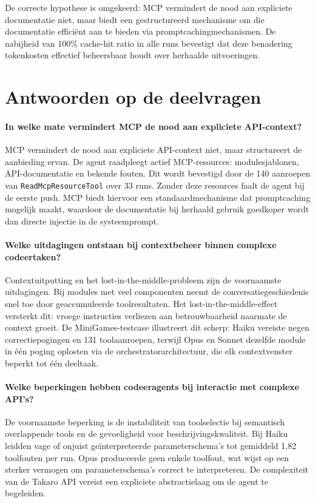 De correcte hypothese is omgekeerd: MCP vermindert de nood aan expliciete documentatie niet, maar biedt een gestructureerd mechanisme om die documentatie efficiënt aan te bieden via promptcachingmechanismen. De nabijheid van 100\% cache-hit ratio in alle runs bevestigt dat deze benadering tokenkosten effectief beheersbaar houdt over herhaalde uitvoeringen.

\section{Antwoorden op de deelvragen}

\paragraph{In welke mate vermindert MCP de nood aan expliciete API-context?}
MCP vermindert de nood aan expliciete API-context niet, maar structureert de aanbieding ervan. De agent raadpleegt actief MCP-resources: modulesjablonen, API-documentatie en bekende fouten. Dit wordt bevestigd door de 140 aanroepen van \texttt{ReadMcpResourceTool} over 33 runs. Zonder deze resources faalt de agent bij de eerste push. MCP biedt hiervoor een standaardmechanisme dat promptcaching mogelijk maakt, waardoor de documentatie bij herhaald gebruik goedkoper wordt dan directe injectie in de systeemprompt.

\paragraph{Welke uitdagingen ontstaan bij contextbeheer binnen complexe codeertaken?}
Contextuitputting en het lost-in-the-middle-probleem zijn de voornaamste uitdagingen. Bij modules met veel componenten neemt de conversatiegeschiedenis snel toe door geaccumuleerde toolresultaten. Het lost-in-the-middle-effect versterkt dit: vroege instructies verliezen aan betrouwbaarheid naarmate de context groeit. De MiniGames-testcase illustreert dit scherp: Haiku vereiste negen correctiepogingen en 131 toolaanroepen, terwijl Opus en Sonnet dezelfde module in één poging oplosten via de orchestratorarchitectuur, die elk contextvenster beperkt tot één deeltaak.

\paragraph{Welke beperkingen hebben codeeragents bij interactie met complexe API's?}
De voornaamste beperking is de instabiliteit van toolselectie bij semantisch overlappende tools en de gevoeligheid voor beschrijvingskwaliteit. Bij Haiku leidden vage of onjuist geïnterpreteerde parameterschema's tot gemiddeld 1,82 toolfouten per run. Opus produceerde geen enkele toolfout, wat wijst op een sterker vermogen om parameterschema's correct te interpreteren. De complexiteit van de Takaro API vereist een expliciete abstractielaag om de agent te begeleiden.

